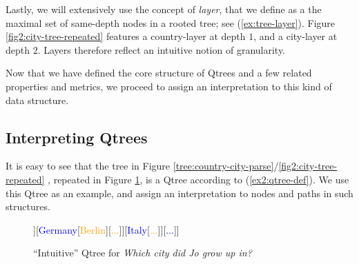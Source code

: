 \begin{exe}
	\ex
	\begin{xlist}	
		\label{ex:tree-node-depth}
		\label{ex:tree-depth}
	\end{xlist}
\end{exe}

Lastly, we will extensively use the concept of \textit{layer}, that we define as a the maximal set of same-depth nodes in a rooted tree; see (\ref{ex:tree-layer}). Figure \ref{fig2:city-tree-repeated} features a country-layer at depth $1$, and a city-layer at depth $2$. Layers therefore reflect an intuitive notion of granularity.

\begin{exe}
	\label{ex:tree-layer}
\end{exe}

Now that we have defined the core structure of Qtrees and a few related properties and metrics, we proceed to assign an interpretation to this kind of data structure.

\subsection{Interpreting Qtrees}

It is easy to see that the tree in Figure \ref{tree:country-city-parse}/\ref{fig2:city-tree-repeated} , repeated in Figure \ref{fig2:city-qtree}, is a Qtree according to (\ref{ex2:qtree-def}). We use this Qtree as an example, and assign an interpretation to nodes and paths in such structures.

\begin{figure}[H]
	\centering
	\begin{forest}
		[{CS\\
			Jo grew up in...}[\textcolor{blue}{France}[\textcolor{orange}{{Paris}}][\textcolor{orange}{Lyon}][\textcolor{orange}{...}]][\textcolor{blue}{Germany}[\textcolor{orange}{Berlin}][\textcolor{orange}{...}]][\textcolor{blue}{Italy}[\textcolor{orange}{...}]][\textcolor{blue}{...}]]
	\end{forest}
	\caption{``Intuitive'' Qtree for \textit{Which city did Jo grow up in?}}\label{fig2:city-qtree}
\end{figure}

